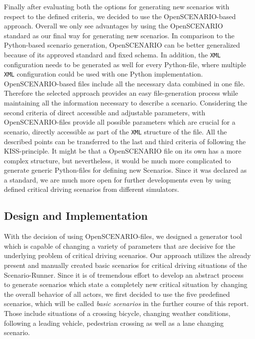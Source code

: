 \documentclass[conference, a4paper, 11pt]{IEEEtran}
\begin{document}
Finally after evaluating both the options for generating new scenarios with respect to the defined criteria, we decided to use the OpenSCENARIO-based approach. Overall we only see advantages by using the OpenSCENARIO standard as our final way for generating new scenarios. In comparison to the Python-based scenario generation, OpenSCENARIO can be better generalized because of its approved standard and fixed schema. In addition, the \texttt{XML} configuration needs to be generated as well for every Python-file, where multiple \texttt{XML} configuration could be used with one Python implementation. OpenSCENARIO-based files include all the necessary data combined in one file. Therefore the selected approach provides an easy file-generation process while maintaining all the information necessary to describe a scenario. Considering the second criteria of direct accessible and adjustable parameters, with OpenSCENARIO-files provide all possible parameters which are crucial for a scenario, directly accessible as part of the \texttt{XML} structure of the file.
All the described points can be transferred to the last and third criteria of following the KISS-principle. It might be that a OpenSCENARIO file on its own has a more complex structure, but nevertheless, it would be much more complicated to generate generic Python-files for defining new Scenarios. Since it was declared as a standard, we are much more open for further developments even by using defined critical driving scenarios from different simulators.

\subsection{Design and Implementation}
With the decision of using OpenSCENARIO-files, we designed a generator tool which is capable of changing a variety of parameters that are decisive for the underlying problem of critical driving scenarios. Our approach utilizes the already present and manually created basic scenarios for critical driving situations of the Scenario-Runner. Since it is of tremendous effort to develop an abstract process to generate scenarios which state a completely new critical situation by changing the overall behavior of all actors, we first decided to use the five predefined scenarios, which will be called \textit{basic scenarios} in the further course of this report. Those include situations of a crossing bicycle,  changing weather conditions, following a leading vehicle, pedestrian crossing as well as a lane changing scenario.
\end{document}
